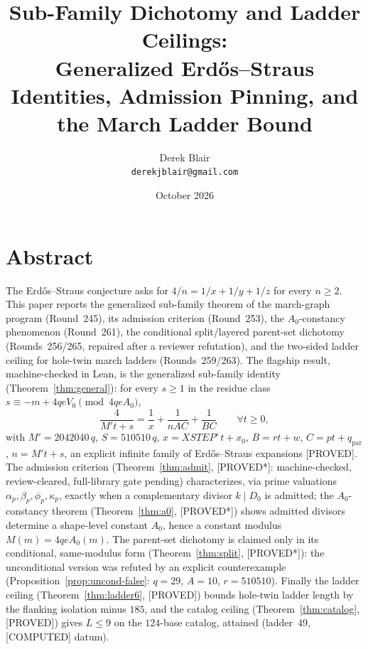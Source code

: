\documentclass[11pt,a4paper]{article}
\title{Sub-Family Dichotomy and Ladder Ceilings:\\
  Generalized Erd\H{o}s--Straus Identities, Admission Pinning, and the
  March Ladder Bound}
\author{Derek Blair \\ \texttt{derekjblair@gmail.com}}
\date{October 2026}
\theoremstyle{definition}
\begin{document}
\maketitle

\section{Abstract}

The Erd\H{o}s--Straus conjecture asks for $4/n=1/x+1/y+1/z$ for every
$n\ge2$. This paper reports the generalized sub-family theorem of the
march-graph program (Round~245), its admission criterion (Round~253),
the $A_0$-constancy phenomenon (Round~261), the conditional
split/layered parent-set dichotomy (Rounds~256/265, repaired after a
reviewer refutation), and the two-sided ladder ceiling for hole-twin
march ladders (Rounds~259/263). The flagship result, machine-checked in
Lean, is the generalized sub-family identity
(Theorem~\ref{thm:general}): for every $s\ge1$ in the residue class
$s\equiv-m+4qeV_0\pmod{4qeA_0}$,
\begin{equation}
  \label{eq:general}
  \frac{4}{M't+s}=\frac{1}{x}+\frac{1}{nAC}+\frac{1}{BC}
  \qquad\forall t\ge0,
\end{equation}
with $M'=2042040\,q$, $S=510510\,q$, $x=XSTEP'\,t+x_0$,
$B=rt+w$, $C=pt+q_{\mathrm{par}}$, $n=M't+s$, an explicit infinite family
of Erd\H{o}s--Straus expansions [PROVED]. The admission criterion
(Theorem~\ref{thm:admit}, [PROVED*]: machine-checked, review-cleared,
full-library gate pending) characterizes, via prime valuations
$\alpha_p,\beta_p,\phi_p,\kappa_p$, exactly when a complementary divisor
$k\mid D_0$ is admitted; the $A_0$-constancy theorem
(Theorem~\ref{thm:a0}, [PROVED*]) shows admitted divisors determine a
shape-level constant $A_0$, hence a constant modulus $M(m)=4qeA_0(m)$.
The parent-set dichotomy is claimed only in its conditional,
same-modulus form (Theorem~\ref{thm:split}, [PROVED*]): the
unconditional version was refuted by an explicit counterexample
(Proposition~\ref{prop:uncond-false}: $q=29$, $A=10$, $r=510510$).
Finally the ladder ceiling (Theorem~\ref{thm:ladder6}, [PROVED]) bounds
hole-twin ladder length by the flanking isolation minus $185$, and the
catalog ceiling (Theorem~\ref{thm:catalog}, [PROVED]) gives $L\le9$ on
the $124$-base catalog, attained (ladder~49, [COMPUTED] datum).

\end{document}
